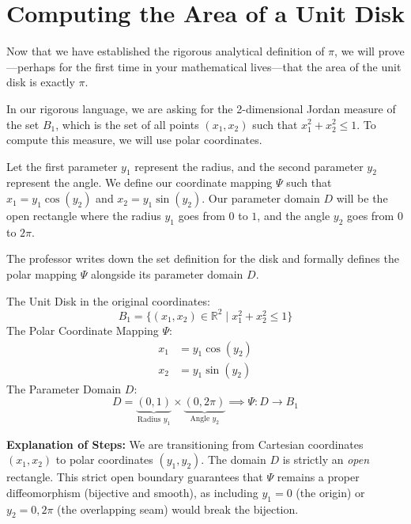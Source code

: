 \setcounter{section}{3} %

\section{Computing the Area of a Unit Disk}

\begin{spoken_clean}[00:15:00 - 00:18:37]
Now that we have established the rigorous analytical definition of $\pi$, we will prove—perhaps for the first time in your mathematical lives—that the area of the unit disk is exactly $\pi$. 

In our rigorous language, we are asking for the 2-dimensional Jordan measure of the set $B_1$, which is the set of all points $(x_1, x_2)$ such that $x_1^2 + x_2^2 \le 1$. To compute this measure, we will use polar coordinates. 

Let the first parameter $y_1$ represent the radius, and the second parameter $y_2$ represent the angle. We define our coordinate mapping $\Psi$ such that $x_1 = y_1 \cos(y_2)$ and $x_2 = y_1 \sin(y_2)$. Our parameter domain $D$ will be the open rectangle where the radius $y_1$ goes from $0$ to $1$, and the angle $y_2$ goes from $0$ to $2\pi$.
\end{spoken_clean}

\begin{nice-box}
The professor writes down the set definition for the disk and formally defines the polar mapping $\Psi$ alongside its parameter domain $D$.
\end{nice-box}

\begin{math_stroke}
The Unit Disk in the original coordinates:
\[
B_1 = \{ (x_1, x_2) \in \mathbb{R}^2 \mid x_1^2 + x_2^2 \le 1 \}
\]
The Polar Coordinate Mapping $\Psi$:
\begin{align*}
x_1 &= y_1 \cos(y_2) \\
x_2 &= y_1 \sin(y_2)
\end{align*}
The Parameter Domain $D$:
\[
D = \underbrace{(0,1)}_{\text{Radius } y_1} \times \underbrace{(0, 2\pi)}_{\text{Angle } y_2} \implies \Psi: D \to B_1
\]

\textbf{Explanation of Steps:}
We are transitioning from Cartesian coordinates $(x_1, x_2)$ to polar coordinates $(y_1, y_2)$. The domain $D$ is strictly an \textit{open} rectangle. This strict open boundary guarantees that $\Psi$ remains a proper diffeomorphism (bijective and smooth), as including $y_1 = 0$ (the origin) or $y_2 = 0, 2\pi$ (the overlapping seam) would break the bijection.
\end{math_stroke}

